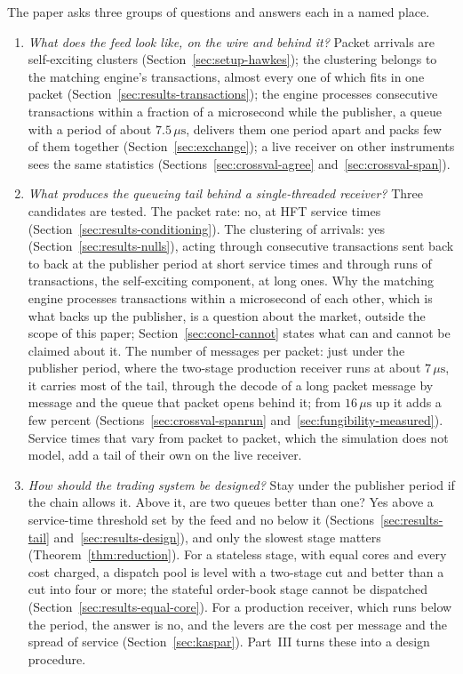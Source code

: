 \documentclass[11pt]{article}
\begin{document}
The paper asks three groups of questions and answers each in a named place.

\begin{enumerate}
    \item \emph{What does the feed look like, on the wire and behind it?} Packet arrivals
are self-exciting clusters (Section~\ref{sec:setup-hawkes}); the clustering belongs to the
matching engine's transactions, almost every one of which fits in one packet
(Section~\ref{sec:results-transactions}); the engine processes consecutive transactions
within a fraction of a microsecond while the publisher, a queue with a period of about
$7.5\,\mu\mathrm{s}$, delivers them one period apart and packs few of them together
(Section~\ref{sec:exchange}); a live receiver on other instruments sees the same
statistics (Sections~\ref{sec:crossval-agree} and~\ref{sec:crossval-span}).
    \item \emph{What produces the queueing tail behind a single-threaded receiver?} Three
candidates are tested. The packet rate: no, at HFT service times
(Section~\ref{sec:results-conditioning}). The clustering of arrivals: yes
(Section~\ref{sec:results-nulls}), acting through consecutive transactions sent back to
back at the publisher period at short service times and through runs of transactions,
the self-exciting component, at long ones. Why the matching engine processes
transactions within a microsecond of each other, which is what backs up the publisher,
is a question about the market, outside the scope of this paper;
Section~\ref{sec:concl-cannot} states what can and cannot be claimed about it. The number
of messages per packet: just under the publisher period, where the two-stage production
receiver runs at about $7\,\mu\mathrm{s}$, it carries most of the tail, through the decode of a long packet
message by message and the queue that packet opens behind it; from $16\,\mu\mathrm{s}$ up
it adds a few percent (Sections~\ref{sec:crossval-spanrun}
and~\ref{sec:fungibility-measured}). Service times that vary from packet to packet, which
the simulation does not model, add a tail of their own on the live receiver.
    \item \emph{How should the trading system be designed?} Stay under the publisher period if
the chain allows it. Above it, are two queues better than one? Yes above a service-time
threshold set by the feed and no below it (Sections~\ref{sec:results-tail}
and~\ref{sec:results-design}), and only the slowest stage matters
(Theorem~\ref{thm:reduction}). For a stateless stage, with equal cores and every cost
charged, a dispatch pool is level with a two-stage cut and better than a cut into four
or more; the stateful order-book stage cannot be dispatched
(Section~\ref{sec:results-equal-core}). For a production receiver, which runs below the
period, the answer is no, and the levers are the cost per message and the spread of service
(Section~\ref{sec:kaspar}). Part~III turns these into a design procedure.
\end{enumerate}
\end{document}
